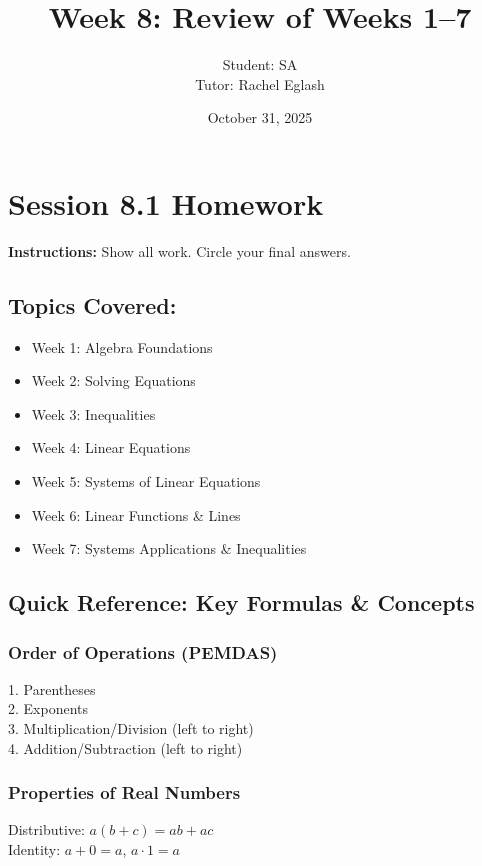 \documentclass[12pt]{article}
\title{Week 8: Review of Weeks 1--7}
\author{
	Student: SA\\
	Tutor: Rachel Eglash}
\date{October 31, 2025}
\begin{document}
	
	\maketitle

	\section*{Session 8.1 Homework}
        
        \textbf{Instructions:} Show all work. Circle your final answers.
        
        \subsection*{Topics Covered:}
        \begin{itemize}
            \item Week 1: Algebra Foundations
            \item Week 2: Solving Equations
            \item Week 3: Inequalities
            \item Week 4: Linear Equations
            \item Week 5: Systems of Linear Equations
            \item Week 6: Linear Functions \& Lines
            \item Week 7: Systems Applications \& Inequalities
        \end{itemize}
	    
        \newpage
	
	    \subsection*{Quick Reference: Key Formulas \& Concepts}
	
	        \subsubsection*{Order of Operations (PEMDAS)}
		    	1. Parentheses \quad \\
                2. Exponents \quad \\
                3. Multiplication/Division (left to right) \quad \\
                4. Addition/Subtraction (left to right)
	
	        \subsubsection*{Properties of Real Numbers}
			    Distributive: $a(b + c) = ab + ac$ \quad \\
                Identity: $a + 0 = a$, $a \cdot 1 = a$
	
\end{document}
